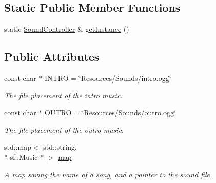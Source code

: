 \subsection*{Static Public Member Functions}
\begin{DoxyCompactItemize}
\item 
static \hyperlink{class_sound_controller}{Sound\+Controller} \& \hyperlink{class_sound_controller_a167ca29530994a8483b090ff044ee49a}{get\+Instance} ()
\end{DoxyCompactItemize}
\subsection*{Public Attributes}
\begin{DoxyCompactItemize}
\item 
\hypertarget{class_sound_controller_afff78ac7ad87e197d22e956efd9da7fc}{const char $\ast$ \hyperlink{class_sound_controller_afff78ac7ad87e197d22e956efd9da7fc}{I\+N\+T\+R\+O} = \char`\"{}Resources/Sounds/intro.\+ogg\char`\"{}}\label{class_sound_controller_afff78ac7ad87e197d22e956efd9da7fc}

\begin{DoxyCompactList}\small\item\em The file placement of the intro music. \end{DoxyCompactList}\item 
\hypertarget{class_sound_controller_a611eafe07f5f5a46a9a4f472ec2b588e}{const char $\ast$ \hyperlink{class_sound_controller_a611eafe07f5f5a46a9a4f472ec2b588e}{O\+U\+T\+R\+O} = \char`\"{}Resources/Sounds/outro.\+ogg\char`\"{}}\label{class_sound_controller_a611eafe07f5f5a46a9a4f472ec2b588e}

\begin{DoxyCompactList}\small\item\em The file placement of the outro music. \end{DoxyCompactList}\item 
\hypertarget{class_sound_controller_a14d67f50bd484514058427f7a083101a}{std\+::map$<$ std\+::string, \\*
sf\+::\+Music $\ast$ $>$ \hyperlink{class_sound_controller_a14d67f50bd484514058427f7a083101a}{map}}\label{class_sound_controller_a14d67f50bd484514058427f7a083101a}

\begin{DoxyCompactList}\small\item\em A map saving the name of a song, and a pointer to the sound file. \end{DoxyCompactList}\end{DoxyCompactItemize}



